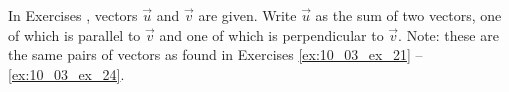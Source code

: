 {\noindent In Exercises}
{, vectors $\vec u$ and $\vec v$ are given. Write $\vec u$ as the sum of two vectors, one of which is parallel to $\vec v$ and one of which is perpendicular to $\vec v$. Note: these are the same pairs of vectors as found in Exercises \ref{ex:10_03_ex_21} -- \ref{ex:10_03_ex_24}.
}
